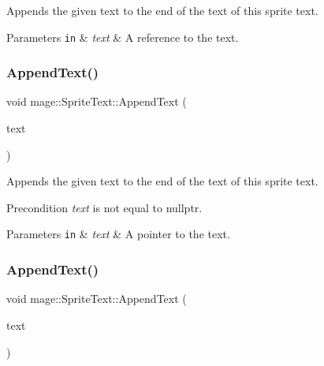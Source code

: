 Appends the given text to the end of the text of this sprite text.


\begin{DoxyParams}[1]{Parameters}
\mbox{\tt in}  & {\em text} & A reference to the text. \\
\hline
\end{DoxyParams}
\hypertarget{classmage_1_1_sprite_text_a462809b9138f94720f972505a4f74d81}{}\label{classmage_1_1_sprite_text_a462809b9138f94720f972505a4f74d81} 
\subsubsection{\texorpdfstring{Append\+Text()}{AppendText()}\hspace{0.1cm}{\footnotesize\ttfamily [2/3]}}
{\footnotesize\ttfamily void mage\+::\+Sprite\+Text\+::\+Append\+Text (\begin{DoxyParamCaption}\item[{const wchar\+\_\+t $\ast$}]{text }\end{DoxyParamCaption})}

Appends the given text to the end of the text of this sprite text.

\begin{DoxyPrecond}{Precondition}
{\itshape text} is not equal to {\ttfamily nullptr}. 
\end{DoxyPrecond}

\begin{DoxyParams}[1]{Parameters}
\mbox{\tt in}  & {\em text} & A pointer to the text. \\
\hline
\end{DoxyParams}
\hypertarget{classmage_1_1_sprite_text_a914e7f755cf8b6ddd22dd66c9108029b}{}\label{classmage_1_1_sprite_text_a914e7f755cf8b6ddd22dd66c9108029b} 
\subsubsection{\texorpdfstring{Append\+Text()}{AppendText()}\hspace{0.1cm}{\footnotesize\ttfamily [3/3]}}
{\footnotesize\ttfamily void mage\+::\+Sprite\+Text\+::\+Append\+Text (\begin{DoxyParamCaption}\item[{const \hyperlink{structmage_1_1_color_string}{Color\+String} \&}]{text }\end{DoxyParamCaption})}

